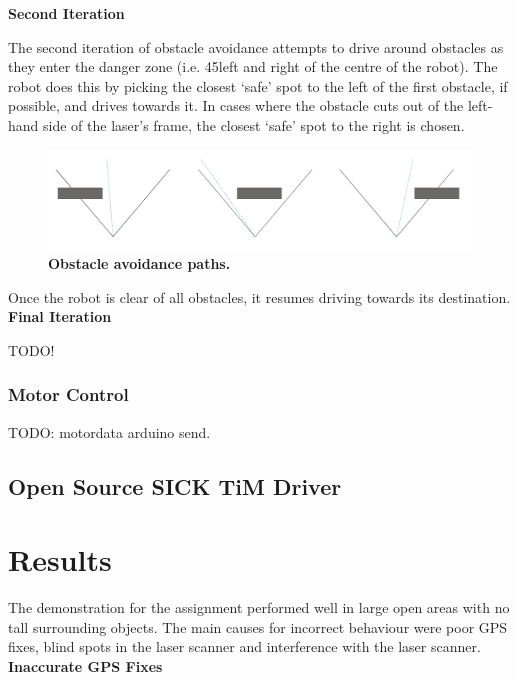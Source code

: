 \documentclass[titlepage,12pt,a4paper]{article}
\begin{document}
\textbf{Second Iteration}

The second iteration of obstacle avoidance attempts to drive around obstacles as they enter the danger zone (i.e. 45\degree left and right of the centre of the robot). The robot does this by picking the closest `safe' spot to the left of the first obstacle, if possible, and drives towards it. In cases where the obstacle cuts out of the left-hand side of the laser's frame, the closest `safe' spot to the right is chosen. 

\begin{figure}[h]
	\centering
	\includegraphics[scale=0.17]{figures/obstacle2.png}
	\caption{\textbf{Obstacle avoidance paths.}}
\end{figure}

Once the robot is clear of all obstacles, it resumes driving towards its destination. \\

\textbf{Final Iteration}

TODO!




\subsubsection{Motor Control}

TODO: motordata arduino send. 

\subsection{Open Source SICK TiM Driver}

\pagebreak
\section{Results}

The demonstration for the assignment performed well in large open areas with no tall surrounding objects. The main causes for incorrect behaviour were poor GPS fixes, blind spots in the laser scanner and interference with the laser scanner. \\

\textbf{Inaccurate GPS Fixes}
\end{document}

